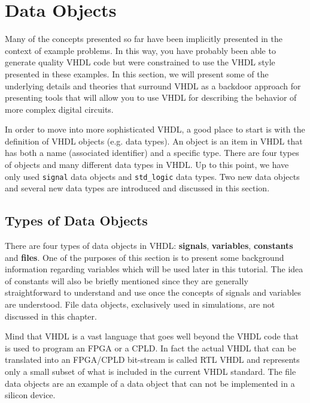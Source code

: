 %
%
\chapter{Data Objects}

Many of the concepts presented so far have been implicitly presented in the context of example problems. In this way, you have probably been able to generate quality VHDL code but were constrained to use the VHDL style presented in these examples. In this section, we will present some of the underlying details and theories that surround VHDL as a backdoor approach for presenting tools that will allow you to use VHDL for describing the behavior of more complex digital circuits.

In order to move into more sophisticated VHDL, a good place to start is with the definition of VHDL objects (e.g. data types). An object is an item in VHDL that has both a name (associated identifier) and a specific type. There are four types of objects and many different data types in VHDL. Up to this point, we have only used \texttt{signal} data objects and \texttt{std\_logic} data types. Two new data objects and several new data types are introduced and discussed in this section.

\section{Types of Data Objects}
There are four types of data objects in VHDL: \textbf{signals}, \textbf{variables}, \textbf{constants} and \textbf{files}. One of the purposes of this section is to present some background information regarding variables which will be used later in this tutorial. The idea of constants will also be briefly mentioned since they are generally straightforward to understand and use once the concepts of signals and variables are understood. File data objects, exclusively used in simulations, are not discussed in this chapter.

Mind that VHDL is a vast language that goes well beyond the VHDL code that is used to program an FPGA or a CPLD. In fact the actual VHDL that can be translated into an FPGA/CPLD bit-stream is called RTL VHDL and represents only a small subset of what is included in the current VHDL standard. The file  data objects are an example of a data object that can not be implemented in a silicon device.

